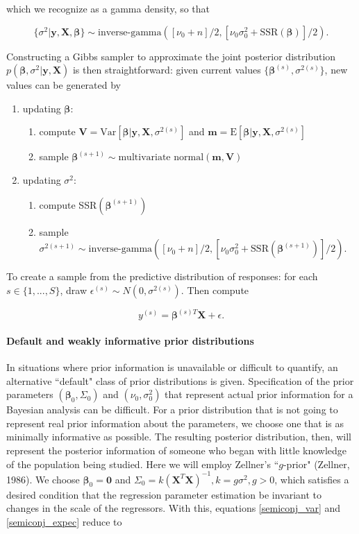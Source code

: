 \documentclass[12pt, a4paper]{article}
\begin{document}
\noindent which we recognize as a gamma density, so that

$$\{\sigma^2|\mathbf{y,X},\boldsymbol\beta\} \sim \text{inverse-gamma}([\nu_0 + n]/2,[\nu_0\sigma^2_0 + \text{SSR}(\boldsymbol\beta)]/2).$$

\noindent Constructing a Gibbs sampler to approximate the joint posterior distribution $p(\boldsymbol\beta,\sigma^2|\mathbf{y,X})$ is then straightforward:  given current values $\{\boldsymbol\beta^{(s)},\sigma^{2(s)}\}$, new values can be generated by

\begin{enumerate}
    \item updating $\boldsymbol\beta$:
    \begin{enumerate}
        \item compute $\mathbf{V} = \text{Var}[\boldsymbol\beta|\mathbf{y,X},\sigma^{2(s)}]$ and $\mathbf{m} = \text{E}[\boldsymbol\beta|\mathbf{y,X},\sigma^{2(s)}]$
        \item sample $\boldsymbol\beta^{(s+1)} \sim \text{multivariate normal}(\mathbf{m,V})$
    \end{enumerate}
    \item updating $\sigma^2$:
    \begin{enumerate}
        \item compute SSR$(\boldsymbol\beta^{(s+1)})$
        \item sample $\sigma^{2(s+1)} \sim \text{inverse-gamma}([\nu_0 + n]/2,[\nu_0\sigma_0^2 + \text{SSR}(\boldsymbol\beta^{(s+1)})]/2)$.
    \end{enumerate}
\end{enumerate}

To create a sample from the predictive distribution of responses:  for each $s\in\{1,...,S\}$, draw $\epsilon^{(s)} \sim N(0,\sigma^{2(s)})$.  Then compute

$$y^{(s)} = \boldsymbol\beta^{(s)T}\mathbf{X} + \epsilon.$$

    \paragraph{Default and weakly informative prior distributions}
    In situations where prior information is unavailable or difficult to quantify, an alternative ``default" class of prior distributions is given. Specification of the prior parameters $(\boldsymbol\beta_0, \Sigma_0)$ and $(\nu_0,\sigma^2_0)$ that represent actual prior information for a Bayesian analysis can be difficult.  For a prior distribution that is not going to represent real prior information about the parameters, we choose one that is as minimally informative as possible.  The resulting posterior distribution, then, will represent the posterior information of someone who began with little knowledge of the population being studied.  Here we will employ Zellner's ``$g$-prior" (Zellner, 1986).  We choose $\boldsymbol\beta_0 = \mathbf{0}$ and $\Sigma_0 = k(\mathbf{X}^T\mathbf{X})^{-1}, k = g\sigma^2, g > 0$, which satisfies a desired condition that the regression parameter estimation be invariant to changes in the scale of the regressors.  With this, equations \ref{semiconj_var} and \ref{semiconj_expec} reduce to
\end{document}
